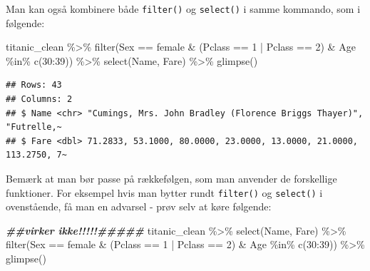 \documentclass[
]{book}
\newenvironment{Shaded}{\begin{snugshade}}{\end{snugshade}}
\newcommand{\DecValTok}[1]{\textcolor[rgb]{0.00,0.00,0.81}{#1}}
\newcommand{\DocumentationTok}[1]{\textcolor[rgb]{0.56,0.35,0.01}{\textbf{\textit{#1}}}}
\newcommand{\FunctionTok}[1]{\textcolor[rgb]{0.00,0.00,0.00}{#1}}
\newcommand{\NormalTok}[1]{#1}
\newcommand{\SpecialCharTok}[1]{\textcolor[rgb]{0.00,0.00,0.00}{#1}}
\newcommand{\StringTok}[1]{\textcolor[rgb]{0.31,0.60,0.02}{#1}}
\begin{document}
Man kan også kombinere både \texttt{filter()} og \texttt{select()} i samme kommando, som i følgende:

\begin{Shaded}
\begin{Highlighting}[]
\NormalTok{titanic\_clean }\SpecialCharTok{\%\textgreater{}\%} 
    \FunctionTok{filter}\NormalTok{(Sex }\SpecialCharTok{==} \StringTok{\textquotesingle{}female\textquotesingle{}} \SpecialCharTok{\&}\NormalTok{ (Pclass }\SpecialCharTok{==} \DecValTok{1} \SpecialCharTok{|}\NormalTok{ Pclass }\SpecialCharTok{==} \DecValTok{2}\NormalTok{) }\SpecialCharTok{\&}\NormalTok{ Age }\SpecialCharTok{\%in\%} \FunctionTok{c}\NormalTok{(}\DecValTok{30}\SpecialCharTok{:}\DecValTok{39}\NormalTok{)) }\SpecialCharTok{\%\textgreater{}\%}
    \FunctionTok{select}\NormalTok{(Name, Fare)  }\SpecialCharTok{\%\textgreater{}\%} 
    \FunctionTok{glimpse}\NormalTok{()}
\end{Highlighting}
\end{Shaded}

\begin{verbatim}
## Rows: 43
## Columns: 2
## $ Name <chr> "Cumings, Mrs. John Bradley (Florence Briggs Thayer)", "Futrelle,~
## $ Fare <dbl> 71.2833, 53.1000, 80.0000, 23.0000, 13.0000, 21.0000, 113.2750, 7~
\end{verbatim}

Bemærk at man bør passe på rækkefølgen, som man anvender de forskellige funktioner. For eksempel hvis man bytter rundt \texttt{filter()} og \texttt{select()} i ovenstående, få man en advarsel - prøv selv at køre følgende:

\begin{Shaded}
\begin{Highlighting}[]
\DocumentationTok{\#\#virker ikke!!!!!\#\#\#\#\#}
\NormalTok{titanic\_clean }\SpecialCharTok{\%\textgreater{}\%} 
    \FunctionTok{select}\NormalTok{(Name, Fare)  }\SpecialCharTok{\%\textgreater{}\%} 
    \FunctionTok{filter}\NormalTok{(Sex }\SpecialCharTok{==} \StringTok{\textquotesingle{}female\textquotesingle{}} \SpecialCharTok{\&}\NormalTok{ (Pclass }\SpecialCharTok{==} \DecValTok{1} \SpecialCharTok{|}\NormalTok{ Pclass }\SpecialCharTok{==} \DecValTok{2}\NormalTok{) }\SpecialCharTok{\&}\NormalTok{ Age }\SpecialCharTok{\%in\%} \FunctionTok{c}\NormalTok{(}\DecValTok{30}\SpecialCharTok{:}\DecValTok{39}\NormalTok{)) }\SpecialCharTok{\%\textgreater{}\%}
    \FunctionTok{glimpse}\NormalTok{()}
\end{Highlighting}
\end{Shaded}
\end{document}
